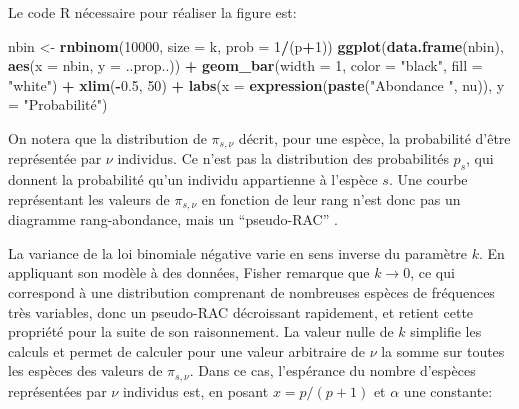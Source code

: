 \documentclass[
  11pt,
  french,
  a4paper,
  extrafontsizes,onecolumn,openright
  ]{memoir}
\newenvironment{Shaded}{\begin{snugshade}}{\end{snugshade}}
\newcommand{\AttributeTok}[1]{\textcolor[rgb]{0.13,0.29,0.53}{#1}}
\newcommand{\DecValTok}[1]{\textcolor[rgb]{0.00,0.00,0.81}{#1}}
\newcommand{\FloatTok}[1]{\textcolor[rgb]{0.00,0.00,0.81}{#1}}
\newcommand{\FunctionTok}[1]{\textcolor[rgb]{0.13,0.29,0.53}{\textbf{#1}}}
\newcommand{\NormalTok}[1]{#1}
\newcommand{\OtherTok}[1]{\textcolor[rgb]{0.56,0.35,0.01}{#1}}
\newcommand{\SpecialCharTok}[1]{\textcolor[rgb]{0.81,0.36,0.00}{\textbf{#1}}}
\newcommand{\StringTok}[1]{\textcolor[rgb]{0.31,0.60,0.02}{#1}}
\begin{document}
\normalsize

Le code R nécessaire pour réaliser la figure est:

\scriptsize

\begin{Shaded}
\begin{Highlighting}[]
\NormalTok{nbin }\OtherTok{\textless{}{-}} \FunctionTok{rnbinom}\NormalTok{(}\DecValTok{10000}\NormalTok{, }\AttributeTok{size =}\NormalTok{ k, }\AttributeTok{prob =} \DecValTok{1}\SpecialCharTok{/}\NormalTok{(p}\SpecialCharTok{+}\DecValTok{1}\NormalTok{))}
\FunctionTok{ggplot}\NormalTok{(}\FunctionTok{data.frame}\NormalTok{(nbin), }\FunctionTok{aes}\NormalTok{(}\AttributeTok{x =}\NormalTok{ nbin, }\AttributeTok{y =}\NormalTok{ ..prop..)) }\SpecialCharTok{+} 
  \FunctionTok{geom\_bar}\NormalTok{(}\AttributeTok{width =} \DecValTok{1}\NormalTok{, }\AttributeTok{color =} \StringTok{"black"}\NormalTok{, }\AttributeTok{fill =} \StringTok{"white"}\NormalTok{) }\SpecialCharTok{+}
  \FunctionTok{xlim}\NormalTok{(}\SpecialCharTok{{-}}\FloatTok{0.5}\NormalTok{, }\DecValTok{50}\NormalTok{) }\SpecialCharTok{+}
  \FunctionTok{labs}\NormalTok{(}\AttributeTok{x =} \FunctionTok{expression}\NormalTok{(}\FunctionTok{paste}\NormalTok{(}\StringTok{"Abondance "}\NormalTok{, nu)), }\AttributeTok{y =} \StringTok{"Probabilité"}\NormalTok{)}
\end{Highlighting}
\end{Shaded}

\normalsize

On notera que la distribution de \({\pi}_{s,\nu}\) décrit, pour une espèce, la probabilité d'être représentée par \(\nu\) individus.
Ce n'est pas la distribution des probabilités \(p_s\), qui donnent la probabilité qu'un individu appartienne à l'espèce \(s\).
Une courbe représentant les valeurs de \({\pi}_{s,\nu}\) en fonction de leur rang n'est donc pas un diagramme rang-abondance, mais un ``pseudo-RAC'' \autocite{Izsak2012}.

La variance de la loi binomiale négative varie en sens inverse du paramètre \(k\).
En appliquant son modèle à des données, Fisher remarque que \(k \to 0\), ce qui correspond à une distribution comprenant de nombreuses espèces de fréquences très variables, donc un pseudo-RAC décroissant rapidement, et retient cette propriété pour la suite de son raisonnement.
La valeur nulle de \(k\) simplifie les calculs et permet de calculer pour une valeur arbitraire de \(\nu\) la somme sur toutes les espèces des valeurs de \({\pi}_{s,\nu}\).
Dans ce cas, l'espérance du nombre d'espèces représentées par \(\nu\) individus est, en posant \(x=p/(p+1)\) et \(\alpha\) une constante:
\end{document}
